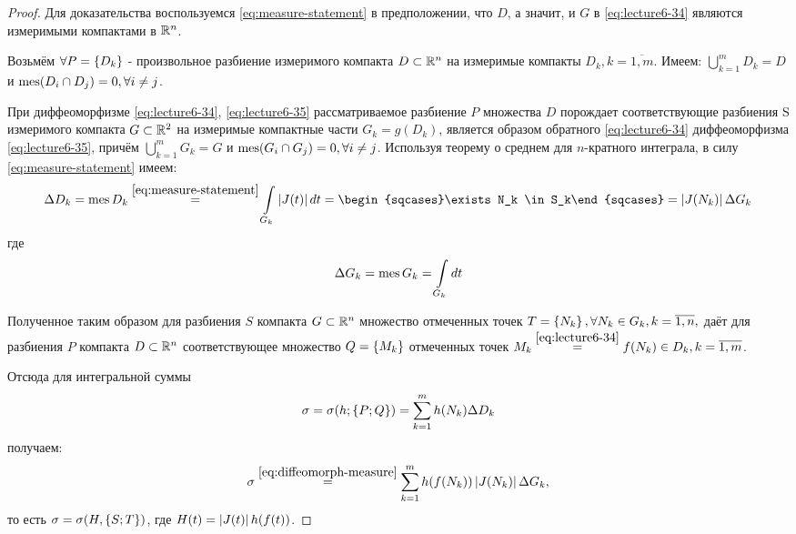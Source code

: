\begin{proof}
	Для доказательства воспользуемся \eqref{eq:measure-statement} в предположении,
	что $D$, а значит, и $G$ в \eqref{eq:lecture6-34} являются измеримыми компактами в $\mathbb{R}^{n}$.

	Возьмём $\forall P = \left\{ D_k \right\}$ - произвольное разбиение измеримого компакта
	$D \subset \mathbb{R}^{n}$ на измеримые компакты $D_k, k = \overline{1, m}$.
	Имеем:
    ${\bigcup\limits_{k = 1}^mD_k = D}$ и ${\operatorname{mes}(D_i \cap D_j) = 0, \forall i \neq j}$.

	При диффеоморфизме \eqref{eq:lecture6-34}, \eqref{eq:lecture6-35} рассматриваемое
	разбиение $P$ множества $D$ порождает соответствующие разбиения S измеримого
	компакта $G \subset \mathbb{R}^{2}$ на измеримые компактные части $G_k = g(D_k)$,
	является образом обратного \eqref{eq:lecture6-34} диффеоморфизма
	\eqref{eq:lecture6-35}, причём 	${\bigcup\limits_{k = 1}^mG_k = G}$ и ${\operatorname{mes}(G_i \cap G_j) = 0, \forall i \neq j}$. Используя теорему о среднем для
	$n$-кратного интеграла, в силу \eqref{eq:measure-statement} имеем:
	\begin{equation}
		\label{eq:diffeomorph-measure}
		\Delta D_k = \mes D_k \overset{\eqref{eq:measure-statement}}{=} \intl_{G_k} \abs{J(t)}dt =
		\begin{sqcases}\exists N_k \in S_k\end{sqcases} =
		\abs{J(N_k)}\Delta{G_k}
	\end{equation}
	где
	\begin{equation*}
		\Delta G_k = \operatorname{mes} G_k = \int\limits_{G_k}dt
	\end{equation*}

	Полученное таким образом для разбиения $S$ компакта $G \subset \mathbb{R}^{n}$ множество отмеченных точек
	$T = \left\{ N_k \right\}, \forall N_k \in G_k, k = \overline{1, n},$ даёт для разбиения $P$ компакта
	$D \subset \mathbb{R}^{n}$ соответствующее множество $Q = \left\{ M_k \right\}$ отмеченных точек $M_k \overset{\eqref{eq:lecture6-34}}{=} f(N_k) \in D_k, k = \overline{1, m}$.

	Отсюда для интегральной суммы
	\begin{equation}
		\label{eq:diffeomorph-integral-summ}
		\sigma = \sigma(h; \left\{ P; Q \right\}) = \sum_{k = 1}^m h(N_k)\Delta D_k
	\end{equation}
	получаем:
	\begin{equation}
		\label{eq:diffeomorph-integral-sum-result}
		\sigma \overset{\eqref{eq:diffeomorph-measure}}{=} \sum_{k = 1}^mh(f(N_k)) \left\lvert J(N_k) \right\rvert \Delta G_k,
	\end{equation}
	то есть $\sigma = \sigma(H, \left\{ S; T \right\})$, где $H(t) = \left\lvert J(t) \right\rvert h(f(t))$.


\end{proof}
